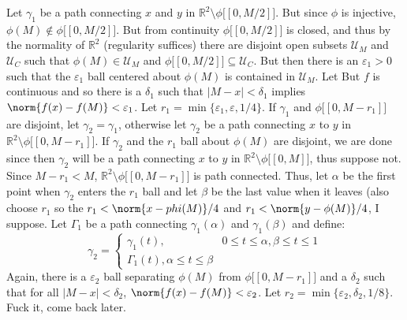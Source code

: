 \begin{bproof}
        Let $\gamma_{1}$ be a path connecting $x$ and $y$ in
        $\mathbb{R}^{2}\setminus\phi\big[[0,M/2]\big]$. But since $\phi$ is
        injective, $\phi(M)\notin\phi\big[[0,M/2]\big]$. But from continuity
        $\phi\big[[0,M/2]\big]$ is closed, and thus by the normality of
        $\mathbb{R}^{2}$ (regularity suffices) there are disjoint open subsets
        $\mathcal{U}_{M}$ and $\mathcal{U}_{C}$ such that
        $\phi(M)\in\mathcal{U}_{M}$ and
        $\phi\big[[0,M/2]\big]\subseteq\mathcal{U}_{C}$. But then there is an
        $\varepsilon_{1}>0$ such that the $\varepsilon_{1}$ ball centered about
        $\phi(M)$ is contained in $\mathcal{U}_{M}$. Let But $f$ is continuous
        and so there is a $\delta_{1}$ such that $|M-x|<\delta_{1}$ implies
        $\norm{f(x)-f(M)}<\varepsilon_{1}$. Let
        $r_{1}=\min\{\varepsilon_{1},\varepsilon,1/4\}$. If
        $\gamma_{1}$ and $\phi\big[[0,M-r_{1}]\big]$ are disjoint, let
        $\gamma_{2}=\gamma_{1}$, otherwise let $\gamma_{2}$ be a path connecting
        $x$ to $y$ in $\mathbb{R}^{2}\setminus\phi\big[[0,M-r_{1}]\big]$.
        If $\gamma_{2}$ and the $r_{1}$ ball about $\phi(M)$ are disjoint, we
        are done since then $\gamma_{2}$ will be a path connecting
        $x$ to $y$ in $\mathbb{R}^{2}\setminus\phi\big[[0,M]\big]$, thus
        suppose not. Since $M-r_{1}<M$,
        $\mathbb{R}^{2}\setminus\phi\big[[0,M-r_{1}]\big]$ is path connected.
        Thus, let $\alpha$ be the first point when $\gamma_{2}$ enters the
        $r_{1}$ ball and let $\beta$ be the last value when it leaves
        (also choose $r_{1}$ so the $r_{1}<\norm{x-phi(M)}/4$ and
        $r_{1}<\norm{y-\phi(M)}/4$, I suppose. Let $\Gamma_{1}$ be a path
        connecting $\gamma_{1}(\alpha)$ and $\gamma_{1}(\beta)$ and define:
        \begin{equation}
            \gamma_{2}=
            \begin{cases}
                \gamma_{1}(t),&0\leq{t}\leq\alpha,\beta\leq{t}\leq{1}\\
                \Gamma_{1}(t),\alpha\leq{t}\leq\beta
            \end{cases}
        \end{equation}
        Again, there is a $\varepsilon_{2}$ ball separating $\phi(M)$ from
        $\phi\big[[0,M-r_{1}]\big]$ and a $\delta_{2}$ such that for all
        $|M-x|<\delta_{2}$, $\norm{f(x)-f(M)}<\varepsilon_{2}$. Let
        $r_{2}=\min\{\varepsilon_{2},\delta_{2},1/8\}$. Fuck it, come back
        later.
    \end{bproof}
